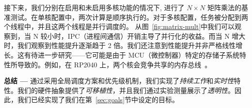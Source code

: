 接下来，我们分别在启用和未启用多核功能的情况下, 进行了 $N\times N$ 矩阵乘法的基准测试。在单核配置中，两次计算是顺序执行的。对于多核配置，任务被分配到两个线程中，并且这两个线程是并行调度的。
从图~\ref{fig:matrix-mult}中我们可以观察到，当 N 较小时，IPC（进程间通信）开销主导了并行化的收益。而当 N 增大时，我们观察到性能提升逐渐趋于 2 倍。我们还注意到性能提升并非严格线性增长。这有待进一步研究——它可能是由于 MCU（微控制器）特定的存储子系统特性所导致的。例如，在 RP2040 上，两个核会竞争共享的内存总线~\cite{pico-mem-layout}。

\textbf{总结 ---} 通过采用全局调度方案和优先级机制，我们实现了\emph{持续工作}和\emph{实时性}特性。我们的硬件抽象提供了\emph{可移植性}，并且我们通过实验测量展示了\emph{透明性}。因此，我们已经实现了我们在第~\ref{sec:goals}节中设定的目标。
                             



